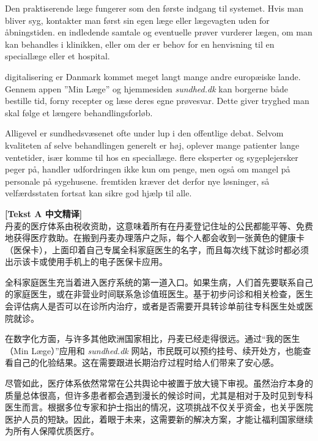 Den praktiserende læge fungerer som den første indgang til systemet. Hvis man bliver syg, kontakter man først sin egen læge eller lægevagten uden for åbningstiden.  en indledende samtale og eventuelle prøver vurderer lægen, om man kan behandles i klinikken, eller om der er behov for en henvisning til en speciallæge eller et hospital.

 digitalisering er Danmark kommet meget langt  mange andre europæiske lande. Gennem appen ”Min Læge” og hjemmesiden \textit{sundhed.dk} kan borgerne både bestille tid, forny recepter og læse deres egne prøvesvar. Dette giver tryghed  man skal følge et længere behandlingsforløb.

Alligevel er sundhedsvæsenet ofte under lup i den offentlige debat. Selvom kvaliteten af selve behandlingen generelt er høj, oplever mange patienter lange ventetider, især  komme til hos en speciallæge.  flere eksperter og sygeplejersker peger på, handler udfordringen ikke kun om penge, men også om mangel på personale på sygehusene.  fremtiden kræver det derfor nye løsninger, så velfærdsstaten fortsat kan sikre god hjælp til alle.

\begin{transbox}
\small
\textbf{\color{NCDTeal}[Tekst A 中文精译]}\\
丹麦的医疗体系由税收资助，这意味着所有在丹麦登记住址的公民都能平等、免费地获得医疗救助。在搬到丹麦办理落户之际，每个人都会收到一张黄色的健康卡（医保卡），上面印着自己专属全科家庭医生的名字，而且每次线下就诊时都必须出示该卡或使用手机上的电子医保卡应用。

全科家庭医生充当着进入医疗系统的第一道入口。如果生病，人们首先要联系自己的家庭医生，或在非营业时间联系急诊值班医生。基于初步问诊和相关检查，医生会评估病人是否可以在诊所内治疗，或者是否需要开具转诊单前往专科医生处或医院就诊。

在数字化方面，与许多其他欧洲国家相比，丹麦已经走得很远。通过“我的医生（Min Læge）”应用和 \textit{sundhed.dk} 网站，市民既可以预约挂号、续开处方，也能查看自己的化验结果。这在需要跟进长期治疗过程时给人们带来了安心感。

尽管如此，医疗体系依然常常在公共舆论中被置于放大镜下审视。虽然治疗本身的质量总体很高，但许多患者都会遇到漫长的候诊时间，尤其是相对于及时见到专科医生而言。根据多位专家和护士指出的情况，这项挑战不仅关乎资金，也关乎医院医护人员的短缺。因此，着眼于未来，这需要新的解决方案，才能让福利国家继续为所有人保障优质医疗。
\end{transbox}

